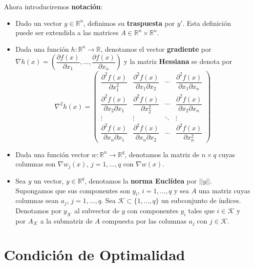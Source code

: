 Ahora introduciremos \textbf{notación}:
\begin{itemize}
	\item Dado un vector $y\in\mathbb{R}^n$, definimos su \textbf{traspuesta} por $y'$. 
	Esta definición puede ser extendida a las matrices $A\in\mathbb{R}^n\times\mathbb{R}^n$. 
	\item Dada una función $h:\mathbb{R}^n\xrightarrow{}{}\mathbb{R}$, denotamos el vector \textbf{gradiente} por $\nabla h(x) = \left( \dfrac{\partial f(x)}{\partial x_1}, ... , \dfrac{\partial f(x)}{\partial x_n} \right)$ y la matriz \textbf{Hessiana} se denota por
	\begin{equation*}
	\nabla^2h(x) =
 \begin{pmatrix}
  \dfrac{\partial^2f(x)}{\partial x_1^2} & \dfrac{\partial^2f(x)}{\partial x_1 \partial x_2} & \cdots & \dfrac{\partial^2f(x)}{\partial x_1 \partial x_n} \\
  \dfrac{\partial^2f(x)}{\partial x_2 \partial x_1} & \dfrac{\partial^2f(x)}{\partial x_2^2} & \cdots & \dfrac{\partial^2f(x)}{\partial x_2 \partial x_n} \\
  \vdots & \vdots & \ddots & \vdots \\
  \dfrac{\partial^2f(x)}{\partial x_n \partial x_1} & \dfrac{\partial^2f(x)}{\partial x_n \partial x_2} & \cdots & \dfrac{\partial^2f(x)}{\partial x_n^2}
 \end{pmatrix}
\label{eq:4.4}
\end{equation*}
	\item Dada una función vector $w:\mathbb{R}^n\xrightarrow{}{}\mathbb{R}^q$, denotamos la matriz de $n\times q$ cuyas columnas son $\nabla w_j(x)$, $j=1,...,q$ con $\nabla w(x)$.
	
	\item Sea $y$ un vector, $y \in \mathbb{R}^q$, denotamos la \textbf{norma Euclídea} por $||y||$. 
	Supongamos que sus componentes son $y_i$, $i=1,...,q$ y sea $A$ una matriz cuyas columnas sean $a_j$, $j=1,...,q$. 
	Sea $\mathcal{K} \subset \{1,...,q\}$ un subconjunto de índices. 
	Denotamos por $y_{\mathcal{K}}$ al subvector de $y$ con componentes $y_i$ tales que $i\in\mathcal{K}$ y por $A_{\mathcal{K}}$ a la submatriz de $A$ compuesta por las columnas $a_j$ con $j\in\mathcal{K}$.
\end{itemize}

\section{Condición de Optimalidad}


